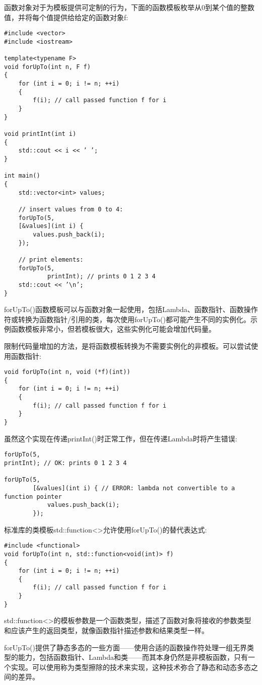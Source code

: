 
函数对象对于为模板提供可定制的行为，下面的函数模板枚举从0到某个值的整数值，并将每个值提供给给定的函数对象f:

\begin{lstlisting}[style=styleCXX]
#include <vector>
#include <iostream>

template<typename F>
void forUpTo(int n, F f)
{
	for (int i = 0; i != n; ++i)
	{
		f(i); // call passed function f for i
	}
}

void printInt(int i)
{
	std::cout << i << ’ ’;
}

int main()
{
	std::vector<int> values;
	
	// insert values from 0 to 4:
	forUpTo(5,
	[&values](int i) {
		values.push_back(i);
	});

	// print elements:
	forUpTo(5,
			printInt); // prints 0 1 2 3 4
	std::cout << ’\n’;
}
\end{lstlisting}

forUpTo()函数模板可以与函数对象一起使用，包括Lambda、函数指针、函数操作符或转换为函数指针/引用的类，每次使用forUpTo()都可能产生不同的实例化。示例函数模板非常小，但若模板很大，这些实例化可能会增加代码量。

限制代码量增加的方法，是将函数模板转换为不需要实例化的非模板。可以尝试使用函数指针:

\begin{lstlisting}[style=styleCXX]
void forUpTo(int n, void (*f)(int))
{
	for (int i = 0; i != n; ++i)
	{
		f(i); // call passed function f for i
	}
}
\end{lstlisting}

虽然这个实现在传递printInt()时正常工作，但在传递Lambda时将产生错误:

\begin{lstlisting}[style=styleCXX]
forUpTo(5,
printInt); // OK: prints 0 1 2 3 4

forUpTo(5,
		[&values](int i) { // ERROR: lambda not convertible to a function pointer
			values.push_back(i);
		});
\end{lstlisting}

标准库的类模板std::function<>允许使用forUpTo()的替代表达式:

\begin{lstlisting}[style=styleCXX]
#include <functional>
void forUpTo(int n, std::function<void(int)> f)
{
	for (int i = 0; i != n; ++i)
	{
		f(i); // call passed function f for i
	}
}
\end{lstlisting}

std::function<>的模板参数是一个函数类型，描述了函数对象将接收的参数类型和应该产生的返回类型，就像函数指针描述参数和结果类型一样。

forUpTo()提供了静态多态的一些方面——使用合适的函数操作符处理一组无界类型的能力，包括函数指针、Lambda和类——而其本身仍然是非模板函数，只有一个实现。可以使用称为类型擦除的技术来实现，这种技术弥合了静态和动态多态之间的差异。






























